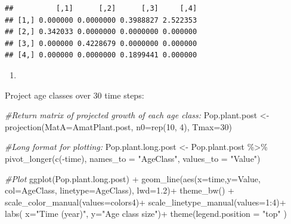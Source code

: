 \documentclass[
]{book}
\newenvironment{Shaded}{\begin{snugshade}}{\end{snugshade}}
\newcommand{\AttributeTok}[1]{\textcolor[rgb]{0.77,0.63,0.00}{#1}}
\newcommand{\CommentTok}[1]{\textcolor[rgb]{0.56,0.35,0.01}{\textit{#1}}}
\newcommand{\DecValTok}[1]{\textcolor[rgb]{0.00,0.00,0.81}{#1}}
\newcommand{\FloatTok}[1]{\textcolor[rgb]{0.00,0.00,0.81}{#1}}
\newcommand{\FunctionTok}[1]{\textcolor[rgb]{0.00,0.00,0.00}{#1}}
\newcommand{\NormalTok}[1]{#1}
\newcommand{\OtherTok}[1]{\textcolor[rgb]{0.56,0.35,0.01}{#1}}
\newcommand{\SpecialCharTok}[1]{\textcolor[rgb]{0.00,0.00,0.00}{#1}}
\newcommand{\StringTok}[1]{\textcolor[rgb]{0.31,0.60,0.02}{#1}}
\providecommand{\tightlist}{%
  \setlength{\itemsep}{0pt}\setlength{\parskip}{0pt}}
\begin{document}
\begin{verbatim}
##          [,1]      [,2]      [,3]     [,4]
## [1,] 0.000000 0.0000000 0.3988827 2.522353
## [2,] 0.342033 0.0000000 0.0000000 0.000000
## [3,] 0.000000 0.4228679 0.0000000 0.000000
## [4,] 0.000000 0.0000000 0.1899441 0.000000
\end{verbatim}

\begin{enumerate}
\def\labelenumi{\arabic{enumi}.}
\setcounter{enumi}{3}
\tightlist
\item
\end{enumerate}

Project age classes over 30 time steps:

\begin{Shaded}
\begin{Highlighting}[]
\CommentTok{\#Return matrix of projected growth of each age class:}
\NormalTok{Pop.plant.post }\OtherTok{\textless{}{-}} \FunctionTok{projection}\NormalTok{(}\AttributeTok{MatA=}\NormalTok{AmatPlant.post, }
                             \AttributeTok{n0=}\FunctionTok{rep}\NormalTok{(}\DecValTok{10}\NormalTok{, }\DecValTok{4}\NormalTok{), }
                             \AttributeTok{Tmax=}\DecValTok{30}\NormalTok{)}
 
\CommentTok{\#Long format for plotting:}
\NormalTok{Pop.plant.long.post }\OtherTok{\textless{}{-}}\NormalTok{ Pop.plant.post }\SpecialCharTok{\%\textgreater{}\%} 
  \FunctionTok{pivot\_longer}\NormalTok{(}\FunctionTok{c}\NormalTok{(}\SpecialCharTok{{-}}\NormalTok{time),}
               \AttributeTok{names\_to =} \StringTok{"AgeClass"}\NormalTok{, }
               \AttributeTok{values\_to =} \StringTok{"Value"}\NormalTok{)}

\CommentTok{\#Plot}
\FunctionTok{ggplot}\NormalTok{(Pop.plant.long.post) }\SpecialCharTok{+} 
  \FunctionTok{geom\_line}\NormalTok{(}\FunctionTok{aes}\NormalTok{(}\AttributeTok{x=}\NormalTok{time,}\AttributeTok{y=}\NormalTok{Value, }\AttributeTok{col=}\NormalTok{AgeClass,}
                \AttributeTok{linetype=}\NormalTok{AgeClass), }\AttributeTok{lwd=}\FloatTok{1.2}\NormalTok{)}\SpecialCharTok{+}
  \FunctionTok{theme\_bw}\NormalTok{() }\SpecialCharTok{+}
  \FunctionTok{scale\_color\_manual}\NormalTok{(}\AttributeTok{values=}\NormalTok{colors4)}\SpecialCharTok{+} 
  \FunctionTok{scale\_linetype\_manual}\NormalTok{(}\AttributeTok{values=}\DecValTok{1}\SpecialCharTok{:}\DecValTok{4}\NormalTok{)}\SpecialCharTok{+}  
  \FunctionTok{labs}\NormalTok{( }\AttributeTok{x=}\StringTok{"Time (year)"}\NormalTok{, }\AttributeTok{y=}\StringTok{"Age class size"}\NormalTok{)}\SpecialCharTok{+} 
  \FunctionTok{theme}\NormalTok{(}\AttributeTok{legend.position =} \StringTok{"top"}\NormalTok{ ) }
\end{Highlighting}
\end{Shaded}
\end{document}
